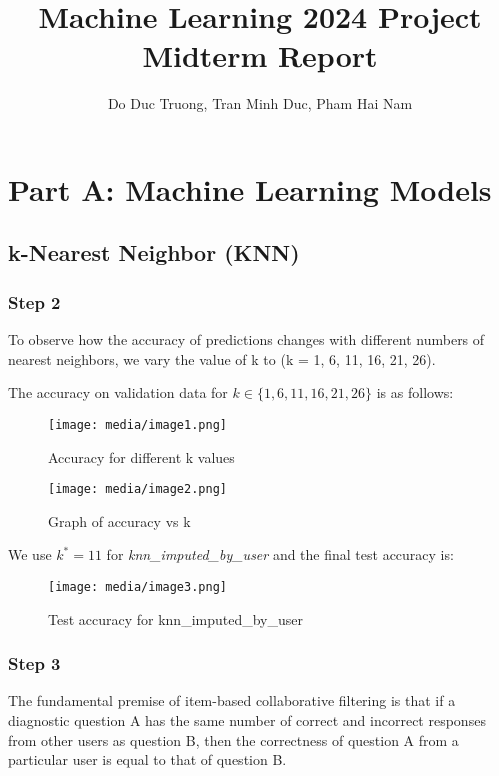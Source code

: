 \documentclass{article}
\title{Machine Learning 2024 Project Midterm Report}
\author{Do Duc Truong, Tran Minh Duc, Pham Hai Nam}
\begin{document}
\maketitle

\section{Part A: Machine Learning Models}

\subsection{k-Nearest Neighbor (KNN)}

\subsubsection{Step 2}
To observe how the accuracy of predictions changes with different numbers of nearest neighbors, we vary the value of k to (k = 1, 6, 11, 16, 21, 26).

The accuracy on validation data for $k \in \{1, 6, 11, 16, 21, 26\}$ is as follows:

\begin{figure}[htbp]
\centering
\texttt{[image: media/image1.png]}
\caption{Accuracy for different k values}
\end{figure}

\begin{figure}[htbp]
\centering
\texttt{[image: media/image2.png]}
\caption{Graph of accuracy vs k}
\end{figure}

We use $k^* = 11$ for \textit{knn\_imputed\_by\_user} and the final test accuracy is:

\begin{figure}[htbp]
\centering
\texttt{[image: media/image3.png]}
\caption{Test accuracy for knn\_imputed\_by\_user}
\end{figure}

\subsubsection{Step 3}
The fundamental premise of item-based collaborative filtering is that if a diagnostic question A has the same number of correct and incorrect responses from other users as question B, then the correctness of question A from a particular user is equal to that of question B.
\end{document}
